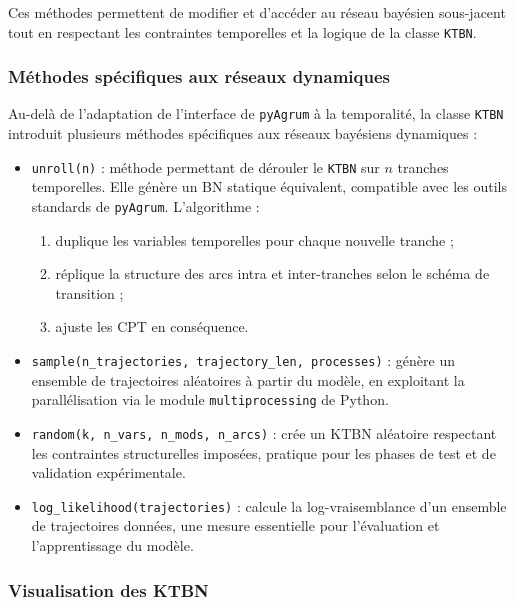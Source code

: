 \documentclass{article}
\begin{document}
Ces méthodes permettent de modifier et d'accéder au réseau bayésien sous-jacent tout en respectant les contraintes
temporelles et la logique de la classe \texttt{KTBN}.


\subsubsection{Méthodes spécifiques aux réseaux dynamiques}

Au-delà de l'adaptation de l'interface de \texttt{pyAgrum} à la temporalité, la classe \texttt{KTBN} introduit
plusieurs méthodes spécifiques aux réseaux bayésiens dynamiques :

\begin{itemize}
    \item \texttt{unroll(n)} : méthode permettant de dérouler le \texttt{KTBN} sur $n$ tranches temporelles.
          Elle génère un BN statique équivalent, compatible avec les outils standards de
          \texttt{pyAgrum}. L'algorithme :
          \begin{enumerate}
              \item duplique les variables temporelles pour chaque nouvelle tranche ;
              \item réplique la structure des arcs intra et inter-tranches selon le schéma de transition ;
              \item ajuste les CPT en conséquence.
          \end{enumerate}
    \item \texttt{sample(n\_trajectories, trajectory\_len, processes)} : génère un ensemble de trajectoires
          aléatoires à partir du modèle, en exploitant la parallélisation via le module
          \texttt{multiprocessing} de Python.
    \item \texttt{random(k, n\_vars, n\_mods, n\_arcs)} : crée un KTBN aléatoire respectant les contraintes
          structurelles imposées, pratique pour les phases de test et de validation expérimentale.
    \item \texttt{log\_likelihood(trajectories)} : calcule la log-vraisemblance d'un ensemble de trajectoires
          données, une mesure essentielle pour l'évaluation et l'apprentissage du modèle.
\end{itemize}


\subsubsection{Visualisation des KTBN}
\end{document}
